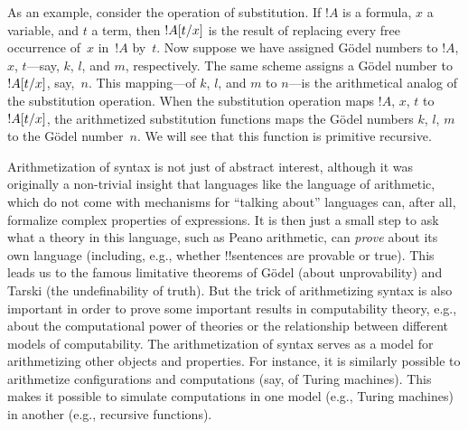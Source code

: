 \documentclass[../../../include/open-logic-section]{subfiles}
\begin{document}
As an example, consider the operation of substitution. If $!A$ is a
formula, $x$ a variable, and $t$ a term, then $!A[t/x]$ is
the result of replacing every free occurrence of~$x$ in~$!A$ by~$t$.
Now suppose we have assigned G\"odel numbers to $!A$, $x$, $t$---say,
$k$, $l$, and $m$, respectively.  The same scheme assigns a G\"odel
number to $!A[t/x]$, say,~$n$.  This mapping---of $k$, $l$,
and $m$ to $n$---is the arithmetical analog of the substitution
operation. When the substitution operation maps $!A$, $x$, $t$ to
$!A[t/x]$, the arithmetized substitution functions maps the
G\"odel numbers $k$, $l$, $m$ to the G\"odel number~$n$.  We will see
that this function is primitive recursive.

Arithmetization of syntax is not just of abstract interest, although
it was originally a non-trivial insight that languages like the
language of arithmetic, which do not come with mechanisms for
``talking about'' languages can, after all, formalize complex
properties of expressions.  It is then just a small step to ask what a
theory in this language, such as Peano arithmetic, can \emph{prove}
about its own language (including, e.g., whether !!{sentence}s are
provable or true).  This leads us to the famous limitative theorems of
G\"odel (about unprovability) and Tarski (the undefinability of
truth). But the trick of arithmetizing syntax is also important in
order to prove some important results in computability theory, e.g.,
about the computational power of theories or the relationship between
different models of computability.  The arithmetization of syntax
serves as a model for arithmetizing other objects and properties. For
instance, it is similarly possible to arithmetize configurations and
computations (say, of Turing machines). This makes it possible to
simulate computations in one model (e.g., Turing machines) in another
(e.g., recursive functions).
\end{document}
